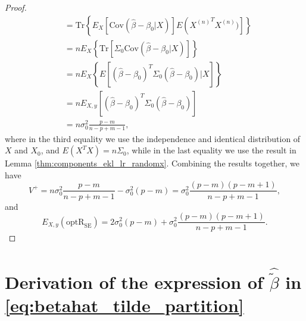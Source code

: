 \begin{proof}
\begin{equation*}
\begin{aligned}
&= \text{Tr} \left\{ E_X\left[ \text{Cov} \left( \hat{\beta} -\beta_0 \big | X \right) \right] E \left ({X^{(n)}}^T X^{(n)}) \right] \right\}\\
&= n E_X \left\{ \text{Tr} \left[ \Sigma_0 \text{Cov} \left( \hat{\beta} - \beta_0  \big | X \right) \right] \right\}\\
&= n E_X \left\{ E\left[ \left(\hat{\beta} - \beta_0 \right)^T \Sigma_0 \left(\hat{\beta} - \beta_0 \right) \big| X \right] \right\} \\
&= n E_{X,y} \left[ \left(\hat{\beta} - \beta_0 \right)^T \Sigma_0 \left(\hat{\beta} - \beta_0 \right) \right]\\
&= n \sigma_0^2 \frac{p-m}{n-p+m-1},
\end{aligned}
\end{equation*}
where in the third equality we use the independence and identical distribution of $X$ and $X_0$, and $E(X^T X) = n\Sigma_0$, while in the last equality we use the result in Lemma \ref{thm:components_ekl_lr_randomx}. Combining the results together, we have
\begin{equation*}
V^+ = n\sigma_0^2 \frac{p-m}{n-p+m-1} - \sigma_0^2 (p-m) = \sigma_0^2\frac{(p-m)(p-m+1)}{n-p+m-1},
\end{equation*}
and 
\begin{equation*}
E_{X,y}(\text{optR}_\text{SE}) = 2\sigma_0^2 (p-m) + \sigma_0^2\frac{(p-m)(p-m+1)}{n-p+m-1}.
\end{equation*}

\end{proof}

\section{Derivation of the expression of \texorpdfstring{$\hat{\tilde{\beta}}$}{} in \eqref{eq:betahat_tilde_partition} }
\label{sec:derivation_betahattilde}


